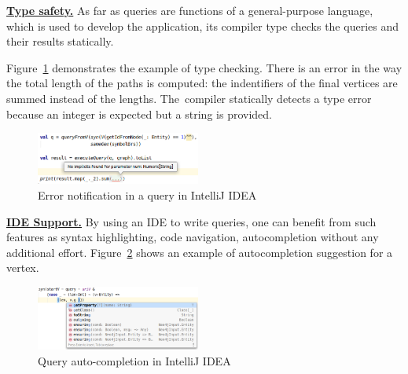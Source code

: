\underline{\textbf{Type safety.}}
As far as queries are functions of a general-purpose language, which is used to develop the application, its compiler type checks the queries and their results statically.

Figure~\ref{fig:types} demonstrates the example of type checking.
There is an error in the way the total length of the paths is computed: the indentifiers of the final vertices are summed instead of the lengths.
The~compiler statically detects a type error because an integer is expected but a string is provided.
{
\setlength{\belowcaptionskip}{-10pt}
\begin{figure}[ht]
   \includegraphics[width=0.48\textwidth]{pictures/image.png}
   \vspace{-0.2cm}
   \caption{Error notification in a query in IntelliJ IDEA}
   \label{fig:types}
\end{figure}
}

\underline{\textbf{IDE Support.}}
By using an IDE to write queries, one can benefit from such features as syntax highlighting, code navigation, autocompletion without any additional effort.
Figure~\ref{fig:autocompletion} shows an example of autocompletion suggestion for a vertex.
{
\setlength{\belowcaptionskip}{-10pt}
\begin{figure}[ht]
    \centering
    \includegraphics[width=0.48\textwidth]{pictures/image1.png}
    \caption{Query auto-completion in IntelliJ IDEA}
    \label{fig:autocompletion}
\end{figure}
}
